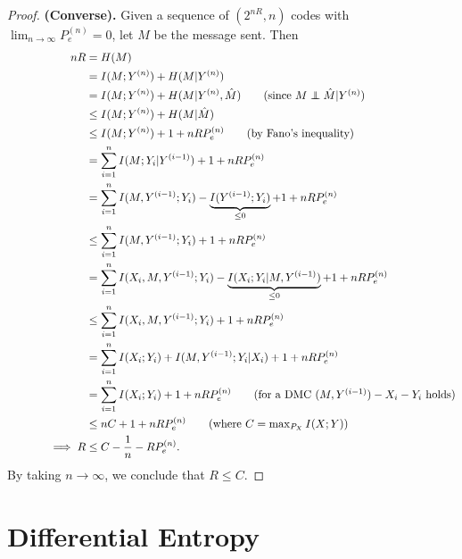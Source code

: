 \documentclass[11pt,a4paper]{article}
\begin{document}
\begin{proof}
    \noindent \textbf{(Converse).} Given a sequence of $(2^{nR},n)$ codes with $\lim_{n\rightarrow \infty} P^{(n)}_e = 0$, let $M$ be the message sent. Then
    \begin{align*}
        nR &= H(M) \\
        \hspace{7em} &= I(M;Y^{(n)}) + H(M|Y^{(n)}) \\
        &= I(M;Y^{(n)}) + H(M|Y^{(n)}, \hat{M}) \tag{since $M\independent \hat{M}|Y^{(n)}$} \\
        &\le I(M;Y^{(n)}) + H(M|\hat{M}) \\
        &\le I(M;Y^{(n)}) + 1 + nRP^{(n)}_e \tag{by Fano's inequality} \\
        &= \sum_{i=1}^{n} I(M;Y_i|Y^{(i-1)}) + 1 + nRP^{(n)}_e  \\
        &= \sum_{i=1}^{n} I(M, Y^{(i-1)};Y_i) - \underbrace{I(Y^{(i-1)}; Y_i)}_{\le 0} + 1 + nRP^{(n)}_e  \\
        &\le \sum_{i=1}^{n} I(M, Y^{(i-1)};Y_i) + 1 + nRP^{(n)}_e  \\
        &= \sum_{i=1}^{n} I(X_i,M, Y^{(i-1)};Y_i) - \underbrace{I(X_i; Y_i| M, Y^{(i-1)})}_{\le 0} + 1 + nRP^{(n)}_e  \\
        &\le \sum_{i=1}^{n} I(X_i,M, Y^{(i-1)};Y_i) + 1 + nRP^{(n)}_e  \\
        &= \sum_{i=1}^{n} I(X_i;Y_i) + I(M, Y^{(i-1)};Y_i| X_i) + 1 + nRP^{(n)}_e  \\
        &= \sum_{i=1}^{n} I(X_i;Y_i) + 1 + nRP^{(n)}_e \tag{for a DMC $(M,Y^{(i-1)}) - X_i - Y_i$ holds}  \\
        &\le nC + 1 + nRP^{(n)}_e \tag{where $C = \max_{P_X}I(X;Y)$} \\
        \implies R &\le C - \dfrac{1}{n} - RP^{(n)}_e.
    \end{align*}
    By taking $n\rightarrow \infty$, we conclude that $R\le C$.
\end{proof}


\section{Differential Entropy}

% 
% 
\end{document}
